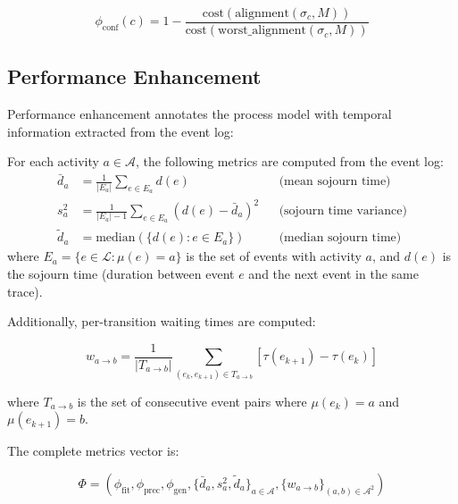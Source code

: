 \begin{equation}
\label{eq:case-conformance}
\phi_{\text{conf}}(c) = 1 - \frac{\text{cost}(\text{alignment}(\sigma_c, M))}{\text{cost}(\text{worst\_alignment}(\sigma_c, M))}
\end{equation}


\subsection{Performance Enhancement}
\label{sec:s2-enhancement}

Performance enhancement annotates the process model with temporal 
information extracted from the event log:

\begin{definition}
\label{def:performance-metrics}
For each activity $a \in \mathcal{A}$, the following metrics are computed 
from the event log:
\begin{align}
\bar{d}_a &= \frac{1}{|E_a|} \sum_{e \in E_a} d(e) 
    && \text{(mean sojourn time)} \label{eq:mean-sojourn} \\
s_a^2 &= \frac{1}{|E_a| - 1} \sum_{e \in E_a} (d(e) - \bar{d}_a)^2 
    && \text{(sojourn time variance)} \label{eq:var-sojourn} \\
\tilde{d}_a &= \text{median}(\{d(e) : e \in E_a\})
    && \text{(median sojourn time)} \label{eq:median-sojourn}
\end{align}
where $E_a = \{e \in \mathcal{L} : \mu(e) = a\}$ is the set of events 
with activity $a$, and $d(e)$ is the sojourn time (duration between 
event $e$ and the next event in the same trace).
\end{definition}

Additionally, per-transition waiting times are computed:

\begin{equation}
\label{eq:waiting-time}
w_{a \to b} = \frac{1}{|T_{a \to b}|} \sum_{(e_k, e_{k+1}) \in T_{a \to b}} 
    [\tau(e_{k+1}) - \tau(e_k)]
\end{equation}

where $T_{a \to b}$ is the set of consecutive event pairs where 
$\mu(e_k) = a$ and $\mu(e_{k+1}) = b$.

The complete metrics vector is:

\begin{equation}
\label{eq:phi}
\Phi = \left( \phi_{\text{fit}}, \phi_{\text{prec}}, \phi_{\text{gen}}, 
    \{\bar{d}_a, s_a^2, \tilde{d}_a\}_{a \in \mathcal{A}}, 
    \{w_{a \to b}\}_{(a,b) \in \mathcal{A}^2} \right)
\end{equation}


